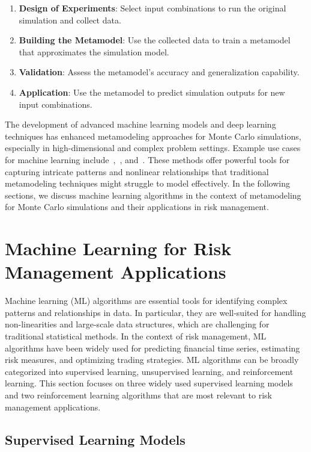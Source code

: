 \begin{enumerate} 
    \item \textbf{Design of Experiments}: Select input combinations to run the original simulation and collect data. 
    \item \textbf{Building the Metamodel}: Use the collected data to train a metamodel that approximates the simulation model. 
    \item \textbf{Validation}: Assess the metamodel's accuracy and generalization capability.
    \item \textbf{Application}: Use the metamodel to predict simulation outputs for new input combinations.
\end{enumerate}

The development of advanced machine learning models and deep learning techniques has enhanced metamodeling approaches for Monte Carlo simulations, especially in high-dimensional and complex problem settings.
Example use cases for machine learning include~\cite{jin2020deep},~\cite{tang2020deep}, and~\cite{rosen2012metamodeling}.
These methods offer powerful tools for capturing intricate patterns and nonlinear relationships that traditional metamodeling techniques might struggle to model effectively.
In the following sections, we discuss machine learning algorithms in the context of metamodeling for Monte Carlo simulations and their applications in risk management.

\section{Machine Learning for Risk Management Applications}

Machine learning (ML) algorithms are essential tools for identifying complex patterns and relationships in data. 
In particular, they are well-suited for handling non-linearities and large-scale data structures, which are challenging for traditional statistical methods. 
In the context of risk management, ML algorithms have been widely used for predicting financial time series, estimating risk measures, and optimizing trading strategies.
ML algorithms can be broadly categorized into supervised learning, unsupervised learning, and reinforcement learning.
This section focuses on three widely used supervised learning models and two reinforcement learning algorithms that are most relevant to risk management applications.

\subsection{Supervised Learning Models}

